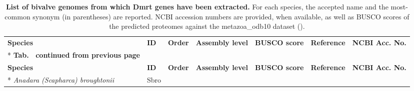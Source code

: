 \begin{landscape}
	\footnotesize
	\begin{longtable}{@{}lllllll@{}}
		\caption{\textbf{List of bivalve genomes from which Dmrt genes have been extracted.} For each species, the accepted name and the most-common synonym (in parentheses) are reported. NCBI accession numbers are provided, when available, as well as BUSCO scores of the predicted proteomes against the metazoa\_odb10 dataset (\textbf{\cite{manni2021busco}}).}
		\label{tab:genomes}                                                                               \\
		\toprule
		\textbf{Species}                                                                                &
		\textbf{ID}                                                                                     &
		\textbf{Order}                                                                                  &
		\textbf{Assembly level}                                                                         &
		\textbf{BUSCO score}                                                                            &
		\textbf{Reference}                                                                              &
		\textbf{NCBI Acc. No.}                                                                            \\* \hline \hline
		\endfirsthead
		\multicolumn{7}{c}%
		{{\bfseries Tab. \thetable\ continued from previous page}}                                       \\
		\toprule
		\textbf{Species}                                                                                &
		\textbf{ID}                                                                                     &
		\textbf{Order}                                                                                  &
		\textbf{Assembly level}                                                                         &
		\textbf{BUSCO score}                                                                            &
		\textbf{Reference}                                                                              &
		\textbf{NCBI Acc. No.}                                                                            \\* \hline \hline
		\endhead
		\endfoot
		\endlastfoot
		\textit{Anadara (Scapharca) broughtonii}                                                        &
		Sbro                                                                                            &

\end{longtable}
\end{landscape}
